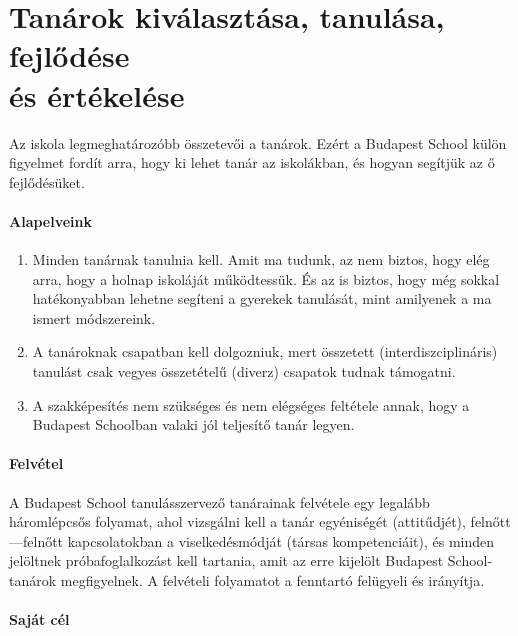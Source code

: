 \hypertarget{tanarok-kivalasztasa-tanulasa-fejlodese-es-ertekelese}{%
\section{Tanárok kiválasztása, tanulása, fejlődése\\ és
értékelése}\label{tanarok-kivalasztasa-tanulasa-fejlodese-es-ertekelese}}

Az iskola legmeghatározóbb összetevői a tanárok. Ezért a Budapest School
külön figyelmet fordít arra, hogy ki lehet tanár az iskolákban, és
hogyan segítjük az ő fejlődésüket.

\paragraph{Alapelveink}
        
\begin{enumerate}
\def\labelenumi{\arabic{enumi}.}
\item
  Minden tanárnak tanulnia kell. Amit ma tudunk, az nem biztos, hogy
  elég arra, hogy a holnap iskoláját működtessük. És az is biztos, hogy
  még sokkal hatékonyabban lehetne segíteni a gyerekek tanulását, mint
  amilyenek a ma ismert módszereink.
\item
  A tanároknak csapatban kell dolgozniuk, mert összetett
  (interdiszciplináris) tanulást csak vegyes összetételű (diverz)
  csapatok tudnak támogatni.
\item
  A szakképesítés nem szükséges és nem elégséges feltétele annak, hogy a
  Budapest Schoolban valaki jól teljesítő tanár legyen.
\end{enumerate}

\hypertarget{felvetel}{%
\paragraph{Felvétel}\label{felvetel}}

A Budapest School tanulásszervező tanárainak felvétele egy legalább
háromlépcsős folyamat, ahol vizsgálni kell a tanár egyéniségét
(attitűdjét), felnőtt---felnőtt kapcsolatokban a viselkedésmódját (társas
kompetenciáit), és minden jelöltnek próbafoglalkozást kell tartania,
amit az erre kijelölt Budapest School-tanárok megfigyelnek. A felvételi
folyamatot a fenntartó felügyeli és irányítja.

\hypertarget{sajat-cel}{%
\paragraph{Saját cél}\label{sajat-cel}}

